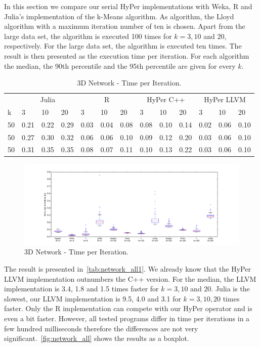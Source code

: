 In this section we compare our serial HyPer implementations with Weka, R and Julia’s implementation of the k-Means algorithm. As algorithm, the Lloyd algorithm with a maximum iteration number of ten is chosen. Apart from the large data set, the algorithm is executed 100 times for $k = 3, 10$ and $20$, respectively. For the large data set, the algorithm is executed ten times. The result is then presented as the execution time per iteration. For each algorithm the median, the 90th percentile and the 95th percentile are given for every $k$. 
\\
\begin{table}[htsb]
  \caption[3D Network - Time per Iteration]{3D Network - Time per Iteration.}
  \label{tab:network_all1}
  \centering
  \begin{tabular}{l l l l l l l l l l l l l}
    \toprule
      & \multicolumn{3}{c}{Julia} & \multicolumn{3}{c}{R} & \multicolumn{3}{c}{HyPer C++} & \multicolumn{3}{c}{HyPer LLVM}  \\
      k & 3 & 10 & 20 & 3 & 10 & 20 & 3 & 10 & 20 & 3 & 10 & 20 \\
    \midrule
      50  & 0.21 & 0.22 & 0.29 & 0.03 & 0.04 & 0.08 & 0.08 & 0.10 & 0.14 & 0.02 & 0.06 & 0.10 \\
      50  & 0.27 & 0.30 & 0.32 & 0.06 & 0.06 & 0.10 & 0.09 & 0.12 & 0.20 & 0.03 & 0.06 & 0.10 \\
      50  & 0.31 & 0.35 & 0.35 & 0.08 & 0.07 & 0.11 & 0.10 & 0.13 & 0.22 & 0.03 & 0.06 & 0.10 \\
    \bottomrule
  \end{tabular}
\end{table}

\begin{figure}[htsb]
  \raggedleft
  \includegraphics[scale=0.4, trim="0cm 1cm 0cm 0cm"]{figures/charts/network_all}
  \caption[3D Network - Time per Iteration]{3D Network - Time per Iteration.}
  \label{fig:network_all}
\end{figure}

The result is presented in~\autoref{tab:network_all1}. We already know that the HyPer LLVM implementation outnumbers the C++ version. For the median, the LLVM implementation is 3.4, 1.8 and 1.5 times faster for $k = 3, 10$ and $20$. Julia is the slowest, our LLVM implementation is 9.5, 4.0 and 3.1 for $k = 3, 10, 20$ times faster. Only the R implementation can compete with our HyPer operator and is even a bit faster. However, all tested programs differ in time per iterations in a few hundred milliseconds therefore the differences are not very significant.~\autoref{fig:network_all} shows the results as a boxplot.

